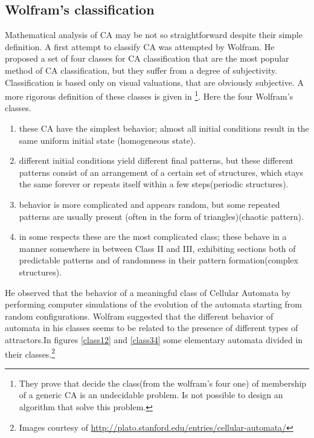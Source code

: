 \subsection{Wolfram's classification}
Mathematical analysis of CA may be not so straightforward despite their simple
definition. A first attempt to classify CA was attempted by
Wolfram\cite{wolfram2002}. He proposed a set of four classes for CA
classification that are the most popular method of CA classification, but they
suffer from a degree of subjectivity. Classification is based only on visual
valuations, that are obviously subjective. A more rigorous definition of these
classes is given in \footnote{They prove that decide the class(from the
wolfram's four one) of membership of a generic CA is an undecidable problem. Is
not possible to design an algorithm that solve this problem.}\cite{culik1998}.
Here the four Wolfram's classes.
\begin{enumerate}
  
  \item these CA have the simplest behavior; almost all initial conditions
  result in the same uniform initial state (homogeneous state).
  \item different initial conditions yield different final patterns, but
  these different patterns consist of an arrangement of a certain set of
  structures, which stays the same forever or repeats itself within a few
  steps(periodic structures).
  \item behavior is more complicated and appears random, but some repeated
  patterns are usually present (often in the form of triangles)(chaotic pattern).
  \item in some respects these are the most complicated class; these behave
  in a manner somewhere in between Class II and III, exhibiting sections
  both of predictable patterns and of randomness in their pattern
  formation(complex structures).
\end{enumerate}
He observed that the behavior of a meaningful class of Cellular Automata
by performing computer simulations of the evolution of the automata starting
from random configurations. Wolfram suggested that the different behavior of
automata in his classes seems to be related to the presence of different types
of attractors.In figures \ref{class12} and \ref{class34} some elementary automata divided in their classes.\footnote{Images courtesy of
\url{http://plato.stanford.edu/entries/cellular-automata/}}

